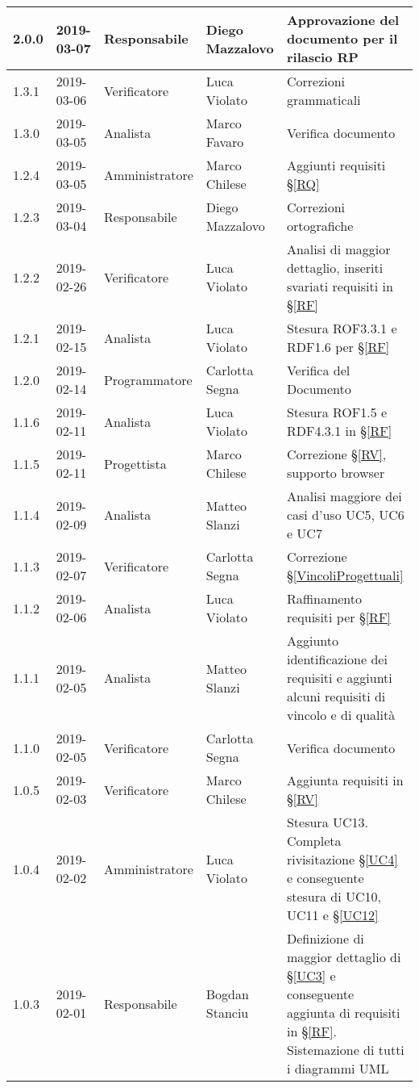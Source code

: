 \begin{center}
\begin{longtable}[C]{|m{}|m{}|m{}|m{}|p{}|}
\hline
2.0.0 & 2019-03-07 & Responsabile & Diego Mazzalovo & Approvazione del documento per il rilascio RP\\
\hline
\rowcolor{grigio}1.3.1 & 2019-03-06 & Verificatore & Luca Violato & Correzioni grammaticali\\
\hline
1.3.0 & 2019-03-05 & Analista & Marco Favaro & Verifica documento\\
\hline
\rowcolor{grigio}1.2.4 & 2019-03-05 & Amministratore & Marco Chilese & Aggiunti requisiti §\ref{RQ}\\
\hline
1.2.3 & 2019-03-04 & Responsabile & Diego Mazzalovo & Correzioni ortografiche\\
\hline
\rowcolor{grigio}1.2.2 & 2019-02-26 & Verificatore & Luca Violato & Analisi di maggior dettaglio, inseriti svariati requisiti in §\ref{RF}\\
\hline
1.2.1 & 2019-02-15 & Analista & Luca Violato & Stesura ROF3.3.1 e RDF1.6 per §\ref{RF}\\
\hline
\rowcolor{grigio} 1.2.0 & 2019-02-14 & Programmatore & Carlotta Segna & Verifica del Documento\\
\hline
1.1.6 & 2019-02-11 & Analista & Luca Violato & Stesura ROF1.5 e RDF4.3.1 in §\ref{RF}\\
\hline
\rowcolor{grigio}1.1.5 & 2019-02-11 & Progettista & Marco Chilese & Correzione §\ref{RV}, supporto browser\\
\hline
1.1.4 & 2019-02-09 & Analista & Matteo Slanzi & Analisi maggiore dei casi d'uso UC5, UC6 e UC7\\
\hline
\rowcolor{grigio} 1.1.3 & 2019-02-07 & Verificatore & Carlotta Segna & Correzione §\ref{VincoliProgettuali}\\
\hline
1.1.2 & 2019-02-06 & Analista & Luca Violato & Raffinamento requisiti per §\ref{RF}\\
\hline
\rowcolor{grigio}1.1.1 & 2019-02-05 & Analista & Matteo Slanzi & Aggiunto identificazione dei requisiti e  aggiunti alcuni requisiti di vincolo e di qualità \\
\hline
1.1.0 & 2019-02-05 & Verificatore & Carlotta Segna & Verifica documento \\
\hline
\rowcolor{grigio}1.0.5 & 2019-02-03 & Verificatore & Marco Chilese & Aggiunta requisiti in §\ref{RV}\\
\hline
1.0.4 & 2019-02-02 & Amministratore & Luca Violato & Stesura UC13. Completa rivisitazione §\ref{UC4} e conseguente stesura di UC10, UC11 e §\ref{UC12}\\
\hline
\rowcolor{grigio}1.0.3 & 2019-02-01 & Responsabile & Bogdan Stanciu &  Definizione di maggior dettaglio di §\ref{UC3} e conseguente aggiunta di requisiti in §\ref{RF}. Sistemazione di tutti i diagrammi UML \\

\end{longtable}
\end{center}
